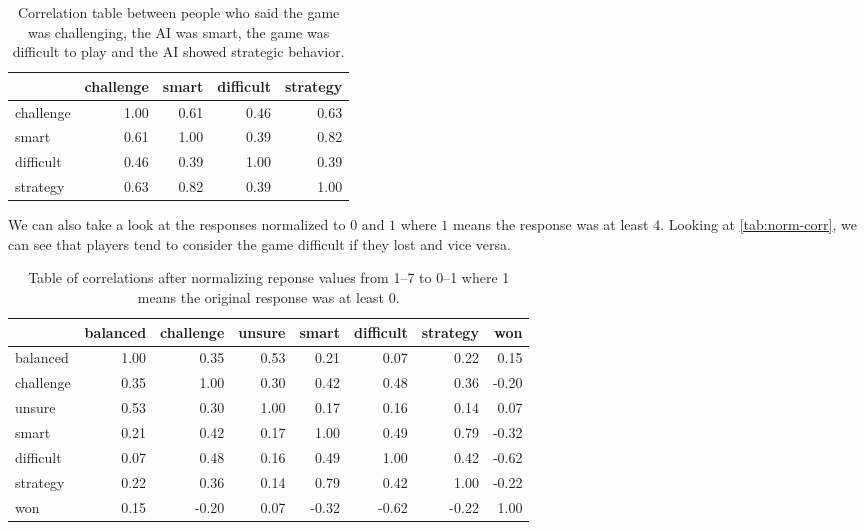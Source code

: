\begin{table}[h]
	\centering
	\begin{tabular}{lrrrr}
		\toprule
		{} &  challenge &  smart &  difficult &  strategy \\
		\midrule
		challenge &       1.00 &   \cellcolor{blue!25}0.61 &       0.46 &      \cellcolor{blue!25}0.63 \\
		smart     &       \cellcolor{blue!25}0.61 &   1.00 &       0.39 &      \cellcolor{blue!25}0.82 \\
		difficult &       0.46 &   0.39 &       1.00 &      0.39 \\
		strategy  &       \cellcolor{blue!25}0.63 &   \cellcolor{blue!25}0.82 &       0.39 &      1.00 \\
		\bottomrule
	\end{tabular}
	\caption{Correlation table between people who said the game was challenging, the AI was smart, the game was difficult to play and the AI showed strategic behavior.}
	\label{tab:difficulty-corr}
\end{table}


We can also take a look at the responses normalized to $0$ and $1$ where $1$ means
the response was at least $4$. Looking at \autoref{tab:norm-corr}, we can see that players
tend to consider the game difficult if they lost and vice versa.

\begin{table}[h]
	\centering
	\begin{tabular}{lrrrrrrr}
		\toprule
		{} &  balanced &  challenge &  unsure &  smart &  difficult &  strategy &   won \\
		\midrule
		balanced  &      1.00 &       0.35 &    \cellcolor{blue!25}0.53 &   0.21 &       0.07 &      0.22 &  0.15 \\
		challenge &      0.35 &       1.00 &    0.30 &   0.42 &       0.48 &      0.36 & -0.20 \\
		unsure    &      \cellcolor{blue!25}0.53 &       0.30 &    1.00 &   0.17 &       0.16 &      0.14 &  0.07 \\
		smart     &      0.21 &       0.42 &    0.17 &   1.00 &       0.49 &      \cellcolor{blue!25}0.79 & -0.32 \\
		difficult &      0.07 &       0.48 &    0.16 &   0.49 &       1.00 &      0.42 & \cellcolor{blue!25}-0.62 \\
		strategy  &      0.22 &       0.36 &    0.14 &   \cellcolor{blue!25}0.79 &       0.42 &      1.00 & -0.22 \\
		won       &      0.15 &      -0.20 &    0.07 &  -0.32 &      \cellcolor{blue!25}-0.62 &     -0.22 &  1.00 \\
		\bottomrule
	\end{tabular}
	\caption{Table of correlations after normalizing reponse values from 1--7 to 0--1 where 1 means the original response was at least 0.}
	\label{tab:norm-corr}
\end{table}

